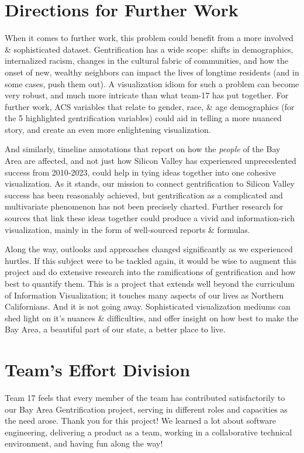 \documentclass{article}
\begin{document}
\section{Directions for Further Work}

    When it comes to further work, this problem could benefit from a more involved \& sophisticated dataset. Gentrification has a wide scope: shifts in demographics, internalized racism, changes in the cultural fabric of communities, and how the onset of new, wealthy neighbors can impact the lives of longtime residents (and in some cases, push them out). A visualization idiom for such a problem can become very robust, and much more intricate than what team-17 has put together. For further work, ACS variables that relate to gender, race, \& age demographics (for the 5 highlighted gentrification variables) could aid in telling a more nuanced story, and create an even more enlightening visualization. 

    And similarly, timeline annotations that report on how the \textit{people} of the Bay Area are affected, and not just how Silicon Valley has experienced unprecedented success from 2010-2023, could help in tying ideas together into one cohesive visualization. As it stands, our mission to connect gentrification to Silicon Valley success has been reasonably achieved, but gentrification as a complicated and multivariate phenomenon has not been precisely charted. Further research for sources that link these ideas together could produce a vivid and information-rich visualization, mainly in the form of well-sourced reports \& formulas.

    Along the way, outlooks and approaches changed significantly as we experienced hurtles. If this subject were to be tackled again, it would be wise to augment this project and do extensive research into the ramifications of gentrification and how best to quantify them. This is a project that extends well beyond the curriculum of Information Visualization; it touches many aspects of our lives as Northern Californians. And it is not going away. Sophisticated visualization mediums can shed light on it's nuances \& difficulties, and offer insight on how best to make the Bay Area, a beautiful part of our state, a better place to live.
    
\section{Team's Effort Division}

Team 17 feels that every member of the team has contributed satisfactorily to our Bay Area Gentrification project, serving in different roles and capacities as the need arose. Thank you for this project! We learned a lot about software engineering, delivering a product as a team, working in a collaborative technical environment, and having fun along the way!

\nocite{*}


\end{document}
